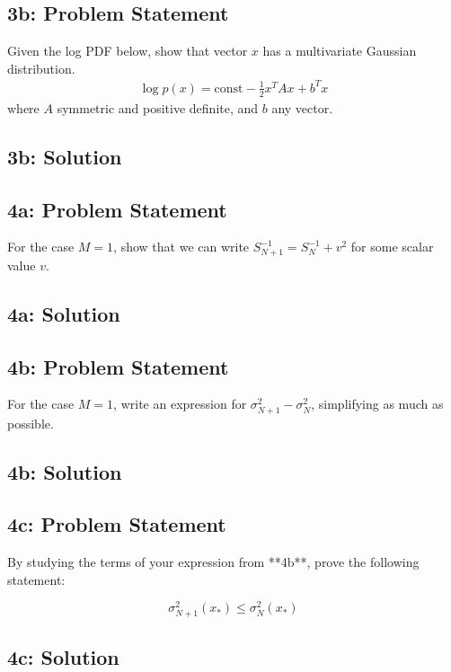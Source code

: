 \documentclass[12pt]{article}
\newcommand{\officialdirections}[1]{{\color{blue} #1}}
\begin{document}
\newpage
\officialdirections{
\subsection*{3b: Problem Statement}
Given the log PDF below, show that vector $x$ has a multivariate Gaussian distribution.
\begin{align}
\log p(x) = \text{const} - \frac{1}{2} x^T A x + b^T x
\end{align}
where $A$ symmetric and positive definite, and $b$ any vector.
}


\subsection{3b: Solution}




\newpage
\officialdirections{
\subsection*{4a: Problem Statement}
For the case $M=1$, show that we can write $S_{N+1}^{-1} = S_N^{-1} + v^2$ for some scalar value $v$.
}

\subsection{4a: Solution}




\newpage
\officialdirections{
\subsection*{4b: Problem Statement}
For the case $M=1$, write an expression for $\sigma^2_{N+1} - \sigma^2_{N}$, simplifying as much as possible. 
}

\subsection{4b: Solution}



\newpage
\officialdirections{
\subsection*{4c: Problem Statement}
By studying the terms of your expression from **4b**, prove the following statement:

$$
\sigma_{N+1}^2(x_*) \leq \sigma_N^2(x_*)
$$
}

\subsection{4c: Solution}
\end{document}
